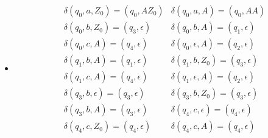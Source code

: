 \documentclass{article}
\begin{document}
\begin{enumerate}
{\begin{enumerate}
{\begin{itemize}
{				\begin{align*}
         			&\delta (q_0, a , Z_0) = \{(q_0, AZ_0)\}
         			&\delta (q_0, a , A) = \{(q_0, AA)\}\\ 
                    &\delta (q_0, b , Z_0) = \{(q_4, \epsilon)\} 
                    &\delta (q_0, b , A) = \{(q_1, \epsilon), (q_2, BA)\} \\
                    &\delta (q_0, c, Z_0) = \{(q_4, \epsilon)\}
					&\delta (q_0, c, A) = \{(q_4, \epsilon)\}\\
					&\delta (q_0, \epsilon , A) = \{(q_4, \epsilon)\}
         			&\delta (q_1, b , A) = \{(q_1, \epsilon)\} \\
         			&\delta (q_1, c , A) = \{(q_4, \epsilon)\}
         			&\delta (q_1, b , Z_0) = \{(q_4, \epsilon)\} \\
         			&\delta (q_2, b , B) = \{(q_2, BB)\}
					&\delta (q_2, c , B) = \{(q_3, \epsilon)\} \\
					&\delta (q_2, \epsilon, A) = \{(q_4, \epsilon)\}
					&\delta (q_2, \epsilon, B) = \{(q_4, \epsilon)\} \\
                    &\delta (q_3, c , B) = \{(q_3, \epsilon)\}
                    &\delta (q_3, c , A) = \{(q_4, \epsilon)\} \\
                    &\delta (q_3, c , Z_0) = \{(q_4, \epsilon)\}
                    &\delta (q_3, \epsilon , A) = \{(q_4, \epsilon)\} \\
         		\end{align*}
			 }
			 
			 \item {
         	        		
				\begin{align*}
					&\delta (q_0, a, Z_0) = (q_0, AZ_0)
					&\delta (q_0, a, A) = (q_0, AA) \\
					&\delta (q_0, b, Z_0) = (q_3, \epsilon)
					&\delta (q_0, b, A) = (q_1, \epsilon) \\
					&\delta (q_0, c, A) = (q_4, \epsilon)
					&\delta (q_0, \epsilon, A) = (q_2, \epsilon) \\
					&\delta (q_1, b, A) = (q_1, \epsilon)
					&\delta (q_1, b, Z_0) = (q_3, \epsilon) \\
					&\delta (q_1, c, A) = (q_4, \epsilon)
					&\delta (q_1, \epsilon, A) = (q_2, \epsilon) \\
					&\delta (q_3, b, \epsilon) = (q_3, \epsilon)
					&\delta (q_3, b, Z_0) = (q_3, \epsilon) \\
					&\delta (q_3, b, A) = (q_3, \epsilon)
					&\delta (q_4, c, \epsilon) = (q_4, \epsilon) \\
					&\delta (q_4, c, Z_0) = (q_4, \epsilon)
					&\delta (q_4, c, A) = (q_4, \epsilon)
         		\end{align*}
			 }
			 

\end{itemize}}
\end{enumerate}}
\end{enumerate}
\end{document}
